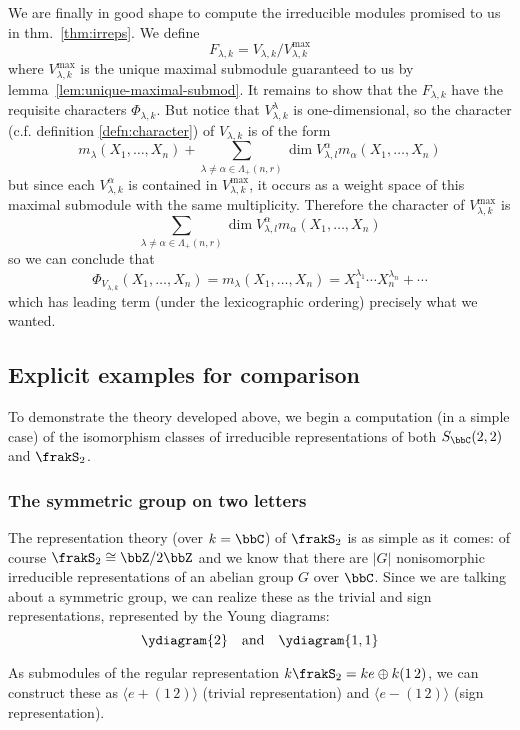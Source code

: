 \documentclass[12pt]{article}
\begin{document}
We are finally in good shape to compute the irreducible modules promised to us in thm.~\ref{thm:irreps}. We define 
\[F_{\lambda, k}=V_{\lambda,k}/V_{\lambda,k}^\text{max}\]
where $V_{\lambda,k}^\text{max}$ is the unique maximal submodule guaranteed to us by lemma~\ref{lem:unique-maximal-submod}. It remains to show 
that the $F_{\lambda,k}$ have the requisite characters $\Phi_{\lambda,k}$. But notice that $V^\lambda_{\lambda,k}$ is one-dimensional, so 
the character (c.f. definition \ref{defn:character}) of $V_{\lambda, k}$ is of the form 
\[m_\lambda(X_1,\dots,X_n)+\sum_{\lambda\ne\alpha\in\Lambda_+(n,r)} \dim V_{\lambda,l}^\alpha m_\alpha(X_1,\dots,X_n)\]
but since each $V_{\lambda,k}^\alpha$ is contained in $V_{\lambda,k}^\text{max}$, it occurs as a weight space of this maximal submodule with the 
same multiplicity. Therefore the character of $V_{\lambda,k}^\text{max}$ is 
\[\sum_{\lambda\ne\alpha\in\Lambda_+(n,r)} \dim V_{\lambda,l}^\alpha m_\alpha(X_1,\dots,X_n)\]
so we can conclude that 
\[\Phi_{V_{\lambda,k}}(X_1,\dots,X_n)=m_\lambda(X_1,\dots,X_n)=X_1^{\lambda_1}\cdots X_n^{\lambda_n}+\cdots\]
which has leading term (under the lexicographic ordering) precisely what we wanted.


\subsection{Explicit examples for comparison}
To demonstrate the theory developed above, we begin a computation (in a simple case) of the isomorphism classes of irreducible 
representations of both $S_\bbC(2,2)$ and $\frakS_2$.

\subsubsection{The symmetric group on two letters}
The representation theory (over $k=\bbC$) of $\frakS_2$ is as simple as it comes: of course $\frakS_2\cong \bbZ/2\bbZ$ and we know that 
there are $|G|$ nonisomorphic irreducible representations of an abelian group $G$ over $\bbC$. Since we are talking about a symmetric group, 
we can realize these as the trivial and sign representations, represented by the Young diagrams:
\[\ydiagram{2}\quad\text{and}\quad\ydiagram{1,1}\]

As submodules of the regular representation $k\frakS_2= k e\oplus k(1\,2)$, we can construct these as $\langle e+(1\, 2)\rangle$ (trivial representation) and $\langle e-(1\,2)\rangle$ (sign representation).
\end{document}
